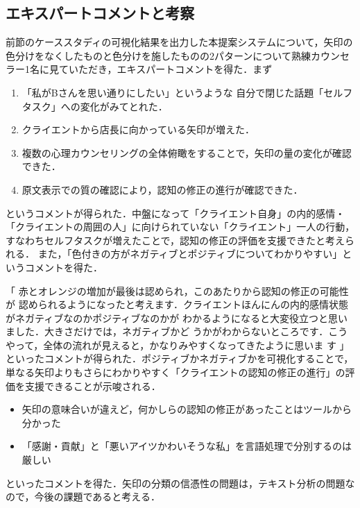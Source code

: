 \documentclass[shuuron]{kuee}
\begin{document}
%

\subsection{エキスパートコメントと考察} %

前節のケーススタディの可視化結果を出力した本提案システムについて，矢印の色分けをなくしたものと色分けを施したものの2パターンについて熟練カウンセラー1名に見ていただき，エキスパートコメントを得た．まず
\begin{enumerate}

  \item 「私がBさんを思い通りにしたい」というような
  自分で閉じた話題「セルフタスク」への変化がみてとれた．
  \item クライエントから店長に向かっている矢印が増えた．
  \item 複数の心理カウンセリングの全体俯瞰をすることで，矢印の量の変化が確認できた．
  \item 原文表示での質の確認により，認知の修正の進行が確認できた．
\end{enumerate}
というコメントが得られた．中盤になって「クライエント自身」の内的感情・「クライエントの周囲の人」に向けられていない「クライエント」一人の行動，すなわちセルフタスクが増えたことで，認知の修正の評価を支援できたと考えられる．
また，「色付きの方がネガティブとポジティブについてわかりやすい」というコメントを得た．


「
赤とオレンジの増加が最後は認められ，このあたりから認知の修正の可能性が
認められるようになったと考えます．クライエントほんにんの内的感情状態がネガティブなのかポジティブなのかが
わかるようになると大変役立つと思いました．大きさだけでは，ネガティブかど
うかがわからないところです．こうやって，全体の流れが見えると，かなりみやすくなってきたように思いま
す
」といったコメントが得られた．ポジティブかネガティブかを可視化することで，単なる矢印よりもさらにわかりやすく「クライエントの認知の修正の進行」の評価を支援できることが示唆される．

\begin{itemize}

  \item 矢印の意味合いが違えど，何かしらの認知の修正があったことはツールから分かった
  \item 「感謝・貢献」と「悪いアイツかわいそうな私」を言語処理で分別するのは厳しい

\end{itemize}
といったコメントを得た．矢印の分類の信憑性の問題は，テキスト分析の問題なので，今後の課題であると考える．
\end{document}
